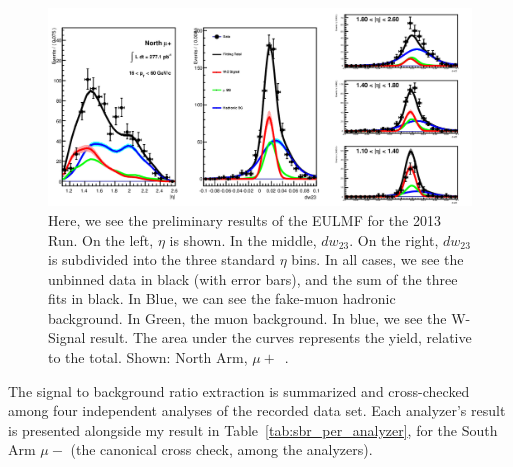 \begin{figure}[ht]
  \centering
  \includegraphics[width=\linewidth]{./figures/prelim_full_maxlikefit_a1q1.jpg}
  \caption{
    Here, we see the preliminary results of the EULMF for the 2013 Run. On the
    left, $\eta$ is shown. In the middle, $dw_{23}$. On the right, $dw_{23}$ is
    subdivided into the three standard $\eta$ bins. In all cases, we see the
    unbinned data in black (with error bars), and the sum of the three fits in
    black. In Blue, we can see the fake-muon hadronic background. In Green, the
    muon background. In blue, we see the W-Signal result. The area under the
    curves represents the yield, relative to the total. Shown: North Arm,
    $\mu+$~\cite{Seidl2014a}.
  }
  \label{fig:maxlikefit_a1q1}
\end{figure}

The signal to background ratio extraction is summarized and cross-checked among
four independent analyses of the recorded data set. Each analyzer's result is
presented alongside my result in Table~\ref{tab:sbr_per_analyzer}, for the South
Arm $\mu-$ (the canonical cross check, among the analyzers).

\begin{table}[ht]
  \centering
  \caption{ 
    South arm $W\rightarrow \mu^{-}$ fit results per analyzer
    ~\cite{Seidl2014a}
  }
  \label{tab:sbr_per_analyzer}
\end{table}
\clearpage

